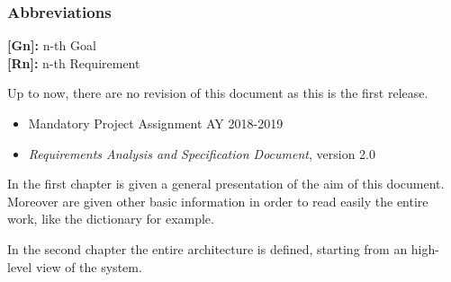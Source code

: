 {{\color{Blue}\subsubsection{Abbreviations}}
\textbf{[Gn]:} n-th Goal\\
\textbf{[Rn]:} n-th Requirement

{}
Up to now, there are no revision of this document as this is the first release.

{}
\begin{itemize}
	\item Mandatory Project Assignment AY 2018-2019
	\item\textit{Requirements Analysis and Specification Document}, version 2.0
\end{itemize}

{}

{}
In the first chapter is given a general presentation of the aim of this document. Moreover are given other basic information in order to read easily the entire work, like the dictionary for example.

{}
In the second chapter the entire architecture is defined, starting from an high-level view of the system.



}
